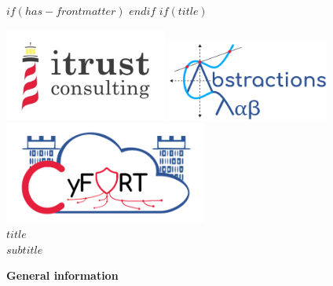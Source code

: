 $if(has-frontmatter)$
\frontmatter
$endif$
$if(title)$
\cleardoublepage
\thispagestyle{empty}

{\centering

\vspace{-3cm}
    \includegraphics[width=0.4\textwidth]{figs/ITR-logo.jpg}
    \hfill
    \includegraphics[width=0.4\textwidth]{figs/Alab-logo.png}\\
    [1cm]
    \includegraphics[width=0.5\textwidth]{figs/CyFORT-logo.png}\\
    [2cm]
    \centering
    \Huge \textbf{\textcolor{AlabRed}{$title$}} \\
    [0.5cm]
\Large \textcolor{AlabLightBlue}{$subtitle$}

\vspace{2ex}

\begin{flushleft}
\textcolor{AlabRed}{\textbf{General information}}\\
\end{flushleft}
\vspace{1ex}

}
